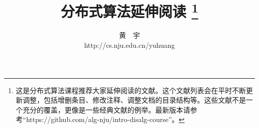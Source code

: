 \documentclass[UTF8]{ctexrep}
\theoremstyle{definition}
\begin{document}
\title{\bf \huge 分布式算法延伸阅读 \footnote{这是分布式算法课程推荐大家延伸阅读的文献。这个文献列表会在平时不断更新调整，包括增删条目、修改注释、调整文档的目录结构等。这些文献不是一个充分的覆盖，更像是一些经典文献的例举。最新版本请参考“https://github.com/alg-nju/intro-disalg-course”。}}

\author{黄\ \ 宇 \\ http://cs.nju.edu.cn/yuhuang}

\date{}
\maketitle

\tableofcontents


 

 

 

 

 

 


%


\end{document}
